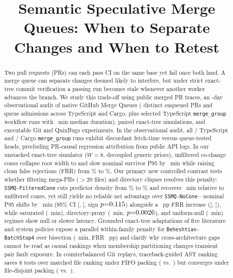 \documentclass[10pt,conference]{IEEEtran}
\begin{document}
\title{Semantic Speculative Merge Queues: When to Separate Changes and When to Retest}

\author{}

\maketitle

\begin{abstract}
Two pull requests (PRs) can each pass CI on the same base yet fail once both land. A merge queue can separate changes deemed likely to interfere, but under strict exact-tree commit verification a passing run becomes stale whenever another worker advances the branch. We study this trade-off using \TraceCount{} public merged PR traces, an \ObsDays{}-day observational audit of native GitHub Merge Queues (\ObsDistinctPrs{} distinct enqueued PRs and \ObsAdmissions{} queue admissions across TypeScript and Cargo, plus \ObsTsWfSelected{} selected TypeScript \texttt{merge\_group} workflow runs with \ObsTsWfP{}~min median duration), paired exact-tree simulations, and executable Git and QuixBugs experiments. In the observational audit, all \ObsTsWfDiscordant{}/\ObsTsWfSelected{} TypeScript and \ObsCargoDiscordant{}/\ObsCargoDiscordant{} Cargo \texttt{merge\_group} runs exhibit discordant fetch-time versus queue-tested heads, precluding PR-causal regression attribution from public API logs. In our unstacked exact-tree simulator ($W{=}8$, decoupled generic priors), unfiltered co-change cones collapse root width to \NomSsmqWidth{} and slow nominal survivor P95 by \NomVsNoCone{}~min while raising clean false rejections (FRR) from \NomNoConeFrr{}\% to \NomSsmqFrr{}\%. Our primary new controlled contrast tests whether filtering mega-PRs ($>20$ files) and directory cliques resolves this penalty: \texttt{SSMQ-FilteredCone} cuts predictor density from \UnfDensity{}\% to \FcDensity{}\% and recovers \FcNomGainVsUnf{}~min relative to unfiltered cones, yet still yields no reliable net advantage over \texttt{SSMQ-NoCone}---nominal P95 shifts by \FcNomDeltaP{}~min (95\% CI [\FcNomDeltaPLo{}, \FcNomDeltaPHi{}], sign $p{=}0.115{}$) alongside a \FcNomDeltaFrr{}~pp FRR increase ([\FcNomDeltaFrrLo{}, \FcNomDeltaFrrHi{}]), while saturated (\FcSatDeltaP{}~min), directory-proxy (\FcDirDeltaP{}~min, $p{=}0.0026{}$), and uniform-null (\FcNullDeltaP{}~min) regimes show null or slower latency. Grounded exact-tree adaptations of five literature and system policies expose a parallel within-family penalty for \texttt{Beheshtian-BatchStop4} over bisection (\BsNomDeltaP{}~min, FRR \BsNomDeltaFrr{}~pp) and clarify why cross-architecture gaps cannot be read as causal rankings when membership partitioning changes transient pair fault exposure. In counterbalanced Git replays, traceback-guided AST ranking saves 8 tests over matched file ranking under FIFO packing (\GitFifoAstTests{} vs.\ \GitFifoFileTests{}) but converges under file-disjoint packing (\GitDisjAstTests{} vs.\ \GitDisjFileTests{}).
\end{abstract}
\end{document}
